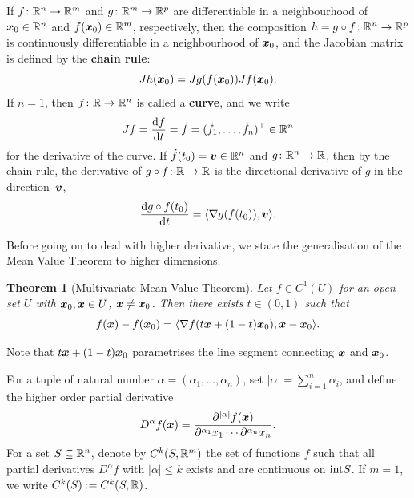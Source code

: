 \documentclass[11pt,a4paper]{memoir}
\newtheorem*{theorem*}{Theorem}
\begin{document}
If $f\colon \mathbb{R}^n\to \mathbb{R}^m$ and $g\colon \mathbb{R}^m\to \mathbb{R}^p$ are differentiable in a neighbourhood of $\bm{x}_0\in \mathbb{R}^n$ and $f(\bm{x}_0)\in \mathbb{R}^m$, respectively, then the composition $h=g\circ f\colon \mathbb{R}^n\to \mathbb{R}^p$ is continuously differentiable in a neighbourhood of $\bm{x}_0$, and the Jacobian matrix is defined by the \textbf{chain rule}:
\begin{equation*}
 Jh(\bm{x}_0) = Jg(f(\bm{x}_0))Jf(\bm{x}_0).
\end{equation*}
If $n=1$, then $f\colon \mathbb{R}\to \mathbb{R}^n$ is called a \textbf{curve}, and we write 
\begin{equation*}
 Jf = \frac{\mathrm{d}{f}}{\mathrm{d}{t}}=\dot{f}=(\dot{f}_1,\dots,\dot{f}_n)^{\top}\in \mathbb{R}^n
\end{equation*}
for the derivative of the curve. If $\dot{f}(t_0)=\bm{v}\in \mathbb{R}^n$ and $g\colon \mathbb{R}^n\to \mathbb{R}$, then by the chain rule, the derivative of $g\circ f\colon \mathbb{R}\to \mathbb{R}$ is the directional derivative of $g$ in the direction~$\bm{v}$,
\begin{equation*}
 \frac{\mathrm{d}{g\circ f}(t_0)}{\mathrm{d}{t}} = \langle {\nabla g(f(t_0))}, {\bm{v}} \rangle.
\end{equation*}

Before going on to deal with higher derivative, we state the generalisation of the Mean Value Theorem to higher dimensions.

\begin{theorem*}[Multivariate Mean Value Theorem]
\strictpagecheck{}
Let $f\in C^1(U)$ for an open set $U$ with $\bm{x}_0,\bm{x}\in U$, $\bm{x}\neq \bm{x}_0$. Then there exists $t\in (0,1)$ such that
\begin{equation*}
  f(\bm{x})-f(\bm{x}_0) = \langle {\nabla f(t\bm{x}+(1-t)\bm{x}_0)}, {\bm{x}-\bm{x}_0} \rangle.
\end{equation*}
\end{theorem*}
Note that $t\bm{x}+(1-t)\bm{x}_0$ parametrises the line segment connecting $\bm{x}$ and $\bm{x}_0$. 

For a tuple of natural number $\alpha = (\alpha_1,\dots,\alpha_n)$, set $|\alpha|=\sum_{i=1}^n \alpha_i$, and define the higher order partial derivative
\begin{equation*}
 D^\alpha f(\bm{x}) = \frac{\partial^{|\alpha|}f(\bm{x})}{\partial^{\alpha_1}x_1\cdots \partial^{\alpha_n}x_n}.
\end{equation*}
For a set $S\subseteq \mathbb{R}^n$, denote by $C^k(S,\mathbb{R}^m)$ the set of functions $f$ such that all partial derivatives $D^\alpha f$ with $|\alpha|\leq k$ exists and are continuous on ${\operatorname{int}} S$. If $m=1$, we write $C^k(S):=C^k(S,\mathbb{R})$.
\end{document}
